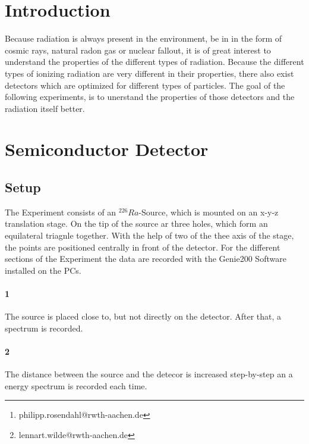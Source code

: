 \documentclass[12pt,twoside,a4paper]{scrartcl}
\author{Philipp Rosendahl Mat.-Nr: 378029\thanks{philipp.rosendahl@rwth-aachen.de}
		\and Lennart Wilde, Mat.-Nr: 381588\thanks{lennart.wilde@rwth-aachen.de}}
\begin{document}
\maketitle
\newpage

\tableofcontents
\newpage


\section{Introduction}

	Because radiation is always present in the environment, be in in the form of cosmic rays, natural radon gas or nuclear fallout, it is of great interest to understand the properties of the different types of radiation.
	Because the different types of ionizing radiation are very different in their properties, there also exist detectors which are optimized for different types of particles. The goal of the following experiments, is to unerstand the properties of those detectors and the radiation itself better.

\section{Semiconductor Detector}

	\subsection{Setup}

		The Experiment consists of an $ ^{226}Ra$-Source, which is mounted on an x-y-z translation stage. On the tip of the source ar three holes, which form an equilateral triagnle together. With the help of two of the thee axis of the stage, the points are positioned centrally in front of the detector. For the different sections of the Experiment the data are recorded with the Genie200 Software installed on the PCs.

		\paragraph{1}
			The source is placed close to, but not directly on the detector. After that, a spectrum is recorded.

		\paragraph{2}
			The distance between the source and the detecor is increased step-by-step an a energy spectrum is recorded each time.
\end{document}
